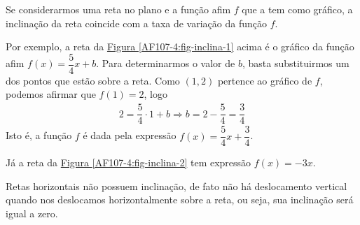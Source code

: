Se considerarmos uma reta no plano e a função afim \(f\) que a tem como gráfico, a inclinação da reta coincide com a taxa de variação da função \(f\).

Por exemplo, a reta da \hyperref[AF107-4:fig-inclina-1]{Figura \ref{AF107-4:fig-inclina-1}} acima é o gráfico da função afim \(f(x)=\dfrac 54 x +b\). Para determinarmos o valor de \(b\), basta substituirmos um dos pontos que estão sobre a reta. Como \((1,2)\) pertence ao gráfico de \(f\), podemos afirmar que \(f(1)=2\), logo
\begin{equation*}
\begin{split}2=\dfrac 54 \cdot 1 + b \Longrightarrow b=2-\dfrac 54 = \dfrac 34\end{split}
\end{equation*}
Isto é, a função \(f\) é dada pela expressão \(f(x)=\dfrac 54 x + \dfrac 34\).

Já a reta da \hyperref[AF107-4:fig-inclina-2]{Figura \ref{AF107-4:fig-inclina-2}} tem expressão \(f(x)=-3x\).

Retas horizontais não possuem inclinação, de fato não há deslocamento vertical quando nos deslocamos horizontalmente sobre a reta, ou seja, sua inclinação será igual a zero.



\label{\detokenize{AF107-6::doc}}\label{\detokenize{AF107-6:praticando}}

